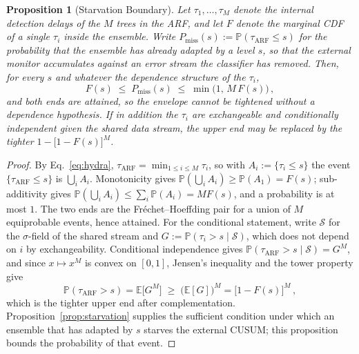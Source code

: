 \documentclass[10pt,conference]{IEEEtran}
\newtheorem{proposition}[theorem]{Proposition}
\theoremstyle{definition}
\begin{document}
\begin{proposition}[Starvation Boundary]\label{prop:starvation_boundary}
  Let $\tau_1, \ldots, \tau_M$ denote the internal detection delays of the $M$ trees in the ARF, and let $F$ denote the marginal CDF of a single $\tau_i$ \emph{inside the ensemble}.
  Write $P_{\mathrm{miss}}(s) := \mathbb{P}(\tau_{\mathrm{ARF}} \le s)$ for the probability that the ensemble has already adapted by a level $s$, so that the external monitor accumulates against an error stream the classifier has removed.
  Then, for every $s$ and \emph{whatever} the dependence structure of the $\tau_i$,
  \begin{equation}\label{eq:pmiss}
    F(s) \;\le\; P_{\mathrm{miss}}(s) \;\le\; \min\bigl(1,\, M\,F(s)\bigr)\,,
  \end{equation}
  and both ends are attained, so the envelope cannot be tightened without a dependence hypothesis.
  If in addition the $\tau_i$ are exchangeable and conditionally independent given the shared data stream, the upper end may be replaced by the tighter $1 - \bigl[1 - F(s)\bigr]^M$.
\end{proposition}

\begin{proof}
  By Eq.~\eqref{eq:hydra}, $\tau_{\mathrm{ARF}} = \min_{1 \le i \le M} \tau_i$, so with $A_i := \{\tau_i \le s\}$ the event $\{\tau_{\mathrm{ARF}} \le s\}$ is $\bigcup_{i} A_i$.
  Monotonicity gives $\mathbb{P}(\bigcup_i A_i) \ge \mathbb{P}(A_1) = F(s)$; sub-additivity gives $\mathbb{P}(\bigcup_i A_i) \le \sum_i \mathbb{P}(A_i) = M F(s)$, and a probability is at most $1$. The two ends are the Fr\'echet--Hoeffding pair for a union of $M$ equiprobable events, hence attained.
  For the conditional statement, write $\mathcal{S}$ for the $\sigma$-field of the shared stream and $G := \mathbb{P}(\tau_i > s \mid \mathcal{S})$, which does not depend on $i$ by exchangeability. Conditional independence gives $\mathbb{P}(\tau_{\mathrm{ARF}} > s \mid \mathcal{S}) = G^M$, and since $x \mapsto x^M$ is convex on $[0,1]$, Jensen's inequality and the tower property give
  \[
    \mathbb{P}(\tau_{\mathrm{ARF}} > s) = \mathbb{E}\bigl[G^M\bigr] \;\ge\; \bigl(\mathbb{E}[G]\bigr)^M = \bigl[1 - F(s)\bigr]^M\,,
  \]
  which is the tighter upper end after complementation. Proposition~\ref{prop:starvation} supplies the sufficient condition under which an ensemble that has adapted by $s$ starves the external CUSUM; this proposition bounds the probability of that event.
\end{proof}
\end{document}
